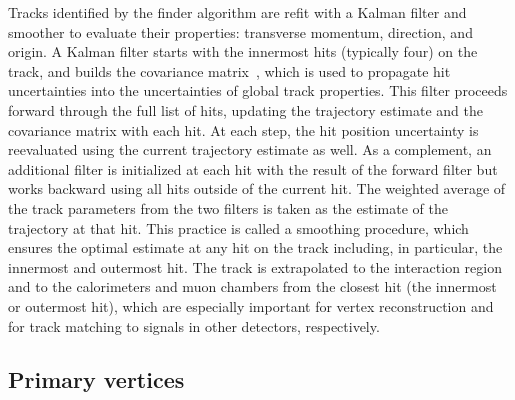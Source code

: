Tracks identified by the finder algorithm are refit with a Kalman filter and smoother to evaluate their properties:
transverse momentum, direction, and origin.
A Kalman filter starts with the innermost hits (typically four) on the track, 
and builds the covariance matrix~\cite{Strandlie:927379}, 
which is used to propagate hit uncertainties into the uncertainties of global track properties. 
This filter proceeds forward through the full list of hits, 
updating the trajectory estimate and the covariance matrix with each hit.
At each step, the hit position uncertainty is reevaluated using the current trajectory estimate as well. 
As a complement, an additional filter is initialized at each hit with the result of the forward filter 
but works backward using all hits outside of the current hit. 
The weighted average of the track parameters from the two filters is taken as the estimate of the trajectory at that hit.
This practice is called a smoothing procedure, which ensures the optimal estimate at any hit on the track
including, in particular, the innermost and outermost hit.
The track is extrapolated to the interaction region and to the calorimeters and muon chambers from the closest hit (the innermost or outermost hit),
which are especially important for vertex reconstruction and for track matching to signals in other detectors, respectively.


\subsection{Primary vertices}\label{sec:reco_pv}

